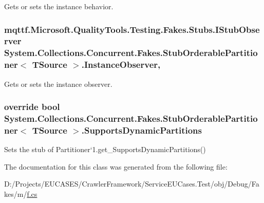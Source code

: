 Gets or sets the instance behavior.

\hypertarget{class_system_1_1_collections_1_1_concurrent_1_1_fakes_1_1_stub_orderable_partitioner_3_01_t_source_01_4_a53303c82610333b2ec1c5f1b5267114e}{
\subsubsection[{Instance\-Observer}]{\setlength{\rightskip}{0pt plus 5cm}mqttf.\-Microsoft.\-Quality\-Tools.\-Testing.\-Fakes.\-Stubs.\-I\-Stub\-Observer System.\-Collections.\-Concurrent.\-Fakes.\-Stub\-Orderable\-Partitioner$<$ T\-Source $>$.Instance\-Observer\hspace{0.3cm}{\ttfamily [get]}, {\ttfamily [set]}}}\label{class_system_1_1_collections_1_1_concurrent_1_1_fakes_1_1_stub_orderable_partitioner_3_01_t_source_01_4_a53303c82610333b2ec1c5f1b5267114e}


Gets or sets the instance observer.

\hypertarget{class_system_1_1_collections_1_1_concurrent_1_1_fakes_1_1_stub_orderable_partitioner_3_01_t_source_01_4_a22b3f2d581edafdd2917bedb8a7352b1}{
\subsubsection[{Supports\-Dynamic\-Partitions}]{\setlength{\rightskip}{0pt plus 5cm}override bool System.\-Collections.\-Concurrent.\-Fakes.\-Stub\-Orderable\-Partitioner$<$ T\-Source $>$.Supports\-Dynamic\-Partitions\hspace{0.3cm}{\ttfamily [get]}}}\label{class_system_1_1_collections_1_1_concurrent_1_1_fakes_1_1_stub_orderable_partitioner_3_01_t_source_01_4_a22b3f2d581edafdd2917bedb8a7352b1}


Sets the stub of Partitioner`1.get\-\_\-\-Supports\-Dynamic\-Partitions()



The documentation for this class was generated from the following file\-:\begin{DoxyCompactItemize}
\item 
D\-:/\-Projects/\-E\-U\-C\-A\-S\-E\-S/\-Crawler\-Framework/\-Service\-E\-U\-Cases.\-Test/obj/\-Debug/\-Fakes/m/\hyperlink{m_2f_8cs}{f.\-cs}\end{DoxyCompactItemize}
